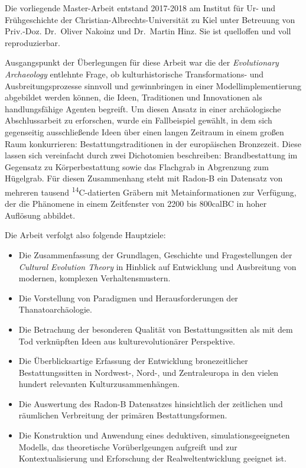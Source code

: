 \documentclass[openany,twoside,twocolumn]{book}
\providecommand{\tightlist}{%
  \setlength{\itemsep}{0pt}\setlength{\parskip}{0pt}}
\begin{document}
Die vorliegende Master-Arbeit entstand 2017-2018 am Institut für Ur- und
Frühgeschichte der Christian-Albrechts-Universität zu Kiel unter
Betreuung von Priv.-Doz. Dr.~Oliver Nakoinz und Dr.~Martin Hinz. Sie ist
quelloffen und voll reproduzierbar.

Ausgangspunkt der Überlegungen für diese Arbeit war die der
\emph{Evolutionary Archaeology} entlehnte Frage, ob kulturhistorische
Transformations- und Ausbreitungsprozesse sinnvoll und gewinnbringen in
einer Modellimplementierung abgebildet werden können, die Ideen,
Traditionen und Innovationen als handlungsfähige Agenten begreift. Um
diesen Ansatz in einer archäologische Abschlussarbeit zu erforschen,
wurde ein Fallbeispiel gewählt, in dem sich gegenseitig ausschließende
Ideen über einen langen Zeitraum in einem großen Raum konkurrieren:
Bestattungstraditionen in der europäischen Bronzezeit. Diese lassen sich
vereinfacht durch zwei Dichotomien beschreiben: Brandbestattung im
Gegensatz zu Körperbestattung sowie das Flachgrab in Abgrenzung zum
Hügelgrab. Für diesen Zusammenhang steht mit Radon-B ein Datensatz von
mehreren tausend \textsuperscript{14}C-datierten Gräbern mit
Metainformationen zur Verfügung, der die Phänomene in einem Zeitfenster
von 2200 bis 800calBC in hoher Auflösung abbildet.

Die Arbeit verfolgt also folgende Hauptziele:

\begin{itemize}
\tightlist
\item
  Die Zusammenfassung der Grundlagen, Geschichte und Fragestellungen der
  \emph{Cultural Evolution Theory} in Hinblick auf Entwicklung und
  Ausbreitung von modernen, komplexen Verhaltensmustern.
\item
  Die Vorstellung von Paradigmen und Herausforderungen der
  Thanatoarchäologie.
\item
  Die Betrachung der besonderen Qualität von Bestattungssitten als mit
  dem Tod verknüpften Ideen aus kulturevolutionärer Perspektive.
\item
  Die Überblicksartige Erfassung der Entwicklung bronezeitlicher
  Bestattungssitten in Nordwest-, Nord-, und Zentraleuropa in den vielen
  hundert relevanten Kulturzusammenhängen.
\item
  Die Auswertung des Radon-B Datensatzes hinsichtlich der zeitlichen und
  räumlichen Verbreitung der primären Bestattungsformen.
\item
  Die Konstruktion und Anwendung eines deduktiven, simulationsgeeigneten
  Modells, das theoretische Vorüberlgeungen aufgreift und zur
  Kontextualisierung und Erforschung der Realweltentwicklung geeignet
  ist.
\end{itemize}
\end{document}
